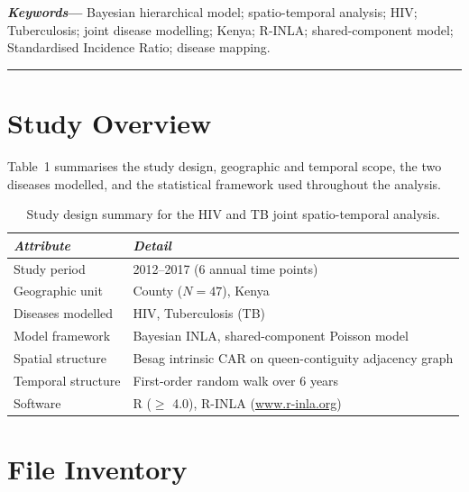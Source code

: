 \documentclass[11pt,a4paper]{article}
\begin{document}
\vspace{4pt}
\noindent\textbf{\textit{Keywords}---}%
Bayesian hierarchical model; spatio-temporal analysis; HIV; Tuberculosis;
joint disease modelling; Kenya; R-INLA; shared-component model;
Standardised Incidence Ratio; disease mapping.

\vspace{6pt}\hrule\vspace{6pt}

\small  %

\section{Study Overview}

Table~1 summarises the study design, geographic and temporal scope, the two
diseases modelled, and the statistical framework used throughout the analysis.

\begin{table}[H]
\caption{Study design summary for the HIV and TB joint spatio-temporal analysis.}
\renewcommand{\arraystretch}{1.10}
\scriptsize\begin{tabularx}{\textwidth}{@{}L{3.5cm}X@{}}
\toprule
\textit{Attribute} & \textit{Detail}\\
\midrule
Study period        & 2012--2017 (6 annual time points)\\
Geographic unit     & County ($N = 47$), Kenya\\
Diseases modelled   & HIV, Tuberculosis (TB)\\
Model framework     & Bayesian INLA, shared-component Poisson model\\
Spatial structure   & Besag intrinsic CAR on queen-contiguity adjacency graph\\
Temporal structure  & First-order random walk over 6 years\\
Software            & R ($\geq$ 4.0), R-INLA (\url{www.r-inla.org})\\
\bottomrule
\end{tabularx}
\renewcommand{\arraystretch}{1.10}
\end{table}

\section{File Inventory}
\end{document}

